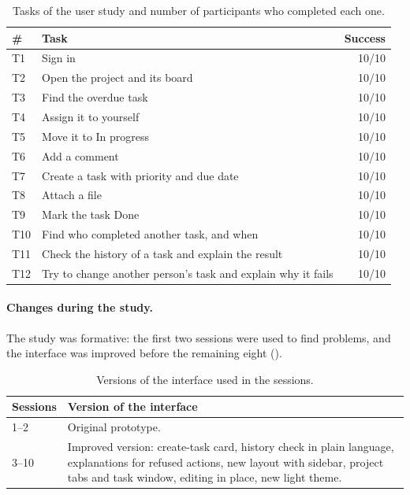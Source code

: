 \begin{table}[tb]
    \centering
    \small
    \begin{tabular}{p{0.6cm}p{7.4cm}r}
        \toprule
        \# & Task & Success \\
        \midrule
        T1 & Sign in & 10/10 \\
        T2 & Open the project and its board & 10/10 \\
        T3 & Find the overdue task & 10/10 \\
        T4 & Assign it to yourself & 10/10 \\
        T5 & Move it to In progress & 10/10 \\
        T6 & Add a comment & 10/10 \\
        T7 & Create a task with priority and due date & 10/10 \\
        T8 & Attach a file & 10/10 \\
        T9 & Mark the task Done & 10/10 \\
        T10 & Find who completed another task, and when & 10/10 \\
        T11 & Check the history of a task and explain the result & 10/10 \\
        T12 & Try to change another person's task and explain why it fails & 10/10 \\
        \bottomrule
    \end{tabular}
    \caption{Tasks of the user study and number of participants who completed each one.}
    \label{tab:usability-tasks}
\end{table}

\paragraph*{Changes during the study.} The study was formative: the first two sessions were used to find problems, and the interface was improved before the remaining eight ().

\begin{table}[tb]
    \centering
    \small
    \begin{tabular}{p{1.6cm}p{10.4cm}}
        \toprule
        Sessions & Version of the interface \\
        \midrule
        1--2 & Original prototype. \\
        3--10 & Improved version: create-task card, history check in plain language, explanations for refused actions, new layout with sidebar, project tabs and task window, editing in place, new light theme. \\
        \bottomrule
    \end{tabular}
    \caption{Versions of the interface used in the sessions.}
    \label{tab:usability-versions}
\end{table}


